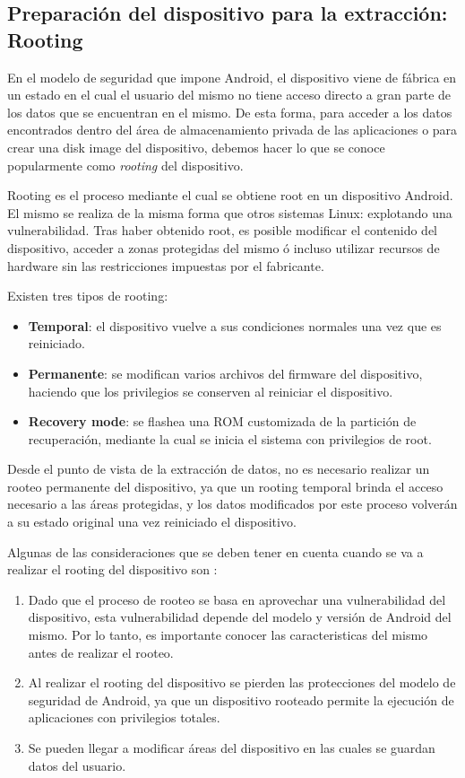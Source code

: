 \subsection{Preparación del dispositivo para la extracción: Rooting}
En el modelo de seguridad que impone Android, el dispositivo viene de fábrica en un estado en el cual el usuario del mismo no tiene acceso directo a gran parte de los datos que se encuentran en el mismo. De esta forma, para acceder a los datos encontrados dentro del área de almacenamiento privada de las aplicaciones o para crear una disk image del dispositivo, debemos hacer lo que se conoce popularmente como \emph{rooting} del dispositivo.

Rooting es el proceso mediante el cual se obtiene root en un dispositivo Android. El mismo se realiza de la misma forma que otros sistemas Linux: explotando una vulnerabilidad. Tras haber obtenido root, es posible modificar el contenido del dispositivo, acceder a zonas protegidas del mismo ó incluso utilizar recursos de hardware sin las restricciones impuestas por el fabricante.

Existen tres tipos de rooting:
\begin{itemize}
\item \textbf{Temporal}: el dispositivo vuelve a sus condiciones normales una vez que es reiniciado.
\item \textbf{Permanente}: se modifican varios archivos del firmware del dispositivo, haciendo que los privilegios se conserven al reiniciar el dispositivo.
\item \textbf{Recovery mode}: se flashea una ROM customizada de la partición de recuperación, mediante la cual se inicia el sistema con privilegios de root.
\end{itemize}

Desde el punto de vista de la extracción de datos, no es necesario realizar un rooteo permanente del dispositivo, ya que un rooting temporal brinda el acceso necesario a las áreas protegidas, y los datos modificados por este proceso volverán a su estado original una vez reiniciado el dispositivo.

Algunas de las consideraciones que se deben tener en cuenta cuando se va a realizar el rooting del dispositivo son \cite{collectmethod}:

\begin{enumerate}[topsep=0pt, parsep=0pt, partopsep=0pt]
\item Dado que el proceso de rooteo se basa en aprovechar una vulnerabilidad del dispositivo, esta vulnerabilidad depende del modelo y versión de Android del mismo. Por lo tanto, es importante conocer las caracteristicas del mismo antes de realizar el rooteo.
\item Al realizar el rooting del dispositivo se pierden las protecciones del modelo de seguridad de Android, ya que un dispositivo rooteado permite la ejecución de aplicaciones con privilegios totales.
\item Se pueden llegar a modificar áreas del dispositivo en las cuales se guardan datos del usuario.
\end{enumerate}

